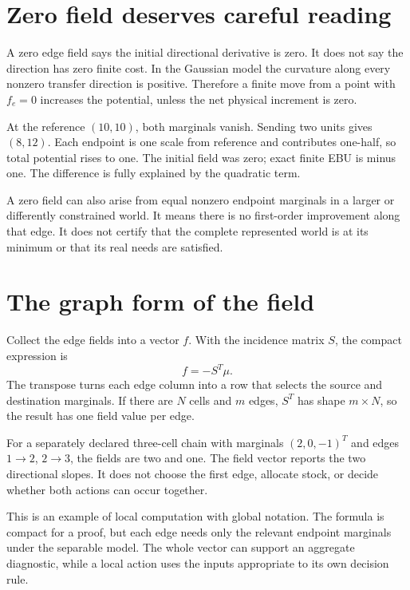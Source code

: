 \section{Zero field deserves careful reading}
A zero edge field says the initial directional derivative is zero. It does not say the direction has zero finite cost. In the Gaussian model the curvature along every nonzero transfer direction is positive. Therefore a finite move from a point with \(f_e=0\) increases the potential, unless the net physical increment is zero.

At the reference \((10,10)\), both marginals vanish. Sending two units gives \((8,12)\). Each endpoint is one scale from reference and contributes one-half, so total potential rises to one. The initial field was zero; exact finite EBU is minus one. The difference is fully explained by the quadratic term.

A zero field can also arise from equal nonzero endpoint marginals in a larger or differently constrained world. It means there is no first-order improvement along that edge. It does not certify that the complete represented world is at its minimum or that its real needs are satisfied.

\section{The graph form of the field}
Collect the edge fields into a vector \(f\). With the incidence matrix \(S\), the compact expression is
\begin{equation}
 f=-S^T\mu.
\end{equation}
The transpose turns each edge column into a row that selects the source and destination marginals. If there are \(N\) cells and \(m\) edges, \(S^T\) has shape \(m\times N\), so the result has one field value per edge.

For a separately declared three-cell chain with marginals \((2,0,-1)^T\) and edges \(1\to2\), \(2\to3\), the fields are two and one. The field vector reports the two directional slopes. It does not choose the first edge, allocate stock, or decide whether both actions can occur together.

This is an example of local computation with global notation. The formula is compact for a proof, but each edge needs only the relevant endpoint marginals under the separable model. The whole vector can support an aggregate diagnostic, while a local action uses the inputs appropriate to its own decision rule.

